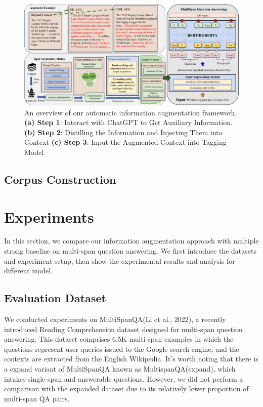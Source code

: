 \documentclass[mathematics,article,submit,moreauthors]{Definitions/mdpi}
\newcommand{\1}[1]{\mathds{1}\left[#1\right]}
\begin{document}
\begin{figure}[H]
	\includegraphics[width=14.0cm]{overview}
	\caption{An overview of our automatic information augmentation framework. \textbf{(a) Step 1}: Interact with ChatGPT to Get Auxiliary Information. \textbf{(b) Step 2}: Distilling the Information and Injecting Them into Context \textbf{(c) Step 3}: Input the Augmented Context into Tagging Model}
	\label{fig:overview}
\end{figure}   


\subsection{Corpus Construction}
\label{sec:corpus_construction}





\section{Experiments}
In this section, we compare our information augmentation approach with multiple strong baseline on multi-span question answering. We first introduce the datasets and experiment setup, then show the experimental results and analysis for different model.

\subsection{Evaluation Dataset}
\label{sec:datasets}
	 We conducted experiments on MultiSpanQA(Li et al., 2022), a recently introduced Reading Comprehension dataset designed for multi-span question answering. This dataset comprises 6.5K multi-span examples in which the questions represent user queries issued to the Google search engine, and the contexts are extracted from the English Wikipedia. It's worth noting that there is a expand variant of MultiSpanQA known as MultispanQA(expand), which intakes single-span and answerable questions. However, we did not perform a comparison with the expanded dataset due to its relatively lower proportion of multi-span QA pairs.
\end{document}
